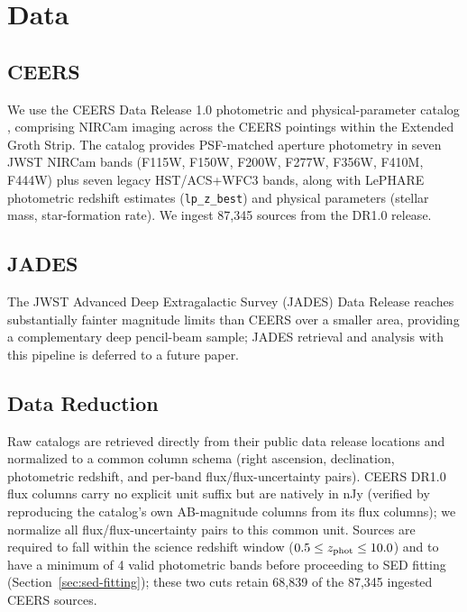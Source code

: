 \documentclass[twocolumn]{aastex631}
\begin{document}
\section{Data}
\label{sec:data}

\subsection{CEERS}
\label{sec:data-ceers}

We use the CEERS Data Release 1.0 photometric and physical-parameter
catalog \citep{Cox2025}, comprising NIRCam \citep{Rieke2023} imaging across
the CEERS \citep{Finkelstein2023} pointings within the Extended Groth
Strip. The catalog provides PSF-matched aperture photometry in seven JWST
NIRCam bands (F115W, F150W, F200W, F277W, F356W, F410M, F444W) plus seven
legacy HST/ACS+WFC3 bands, along with LePHARE photometric redshift
estimates (\texttt{lp\_z\_best}) and physical parameters (stellar mass,
star-formation rate). We ingest 87,345 sources from the DR1.0 release.

\subsection{JADES}
\label{sec:data-jades}

The JWST Advanced Deep Extragalactic Survey (JADES) Data Release
\citep{Eisenstein2023} reaches substantially fainter magnitude limits than
CEERS over a smaller area, providing a complementary deep pencil-beam
sample; JADES retrieval and analysis with this pipeline is deferred to a
future paper.

\subsection{Data Reduction}
\label{sec:data-reduction}

Raw catalogs are retrieved directly from their public data release
locations and normalized to a common column schema (right ascension,
declination, photometric redshift, and per-band flux/flux-uncertainty
pairs). CEERS DR1.0 flux columns carry no explicit unit suffix but are
natively in nJy (verified by reproducing the catalog's own AB-magnitude
columns from its flux columns); we normalize all flux/flux-uncertainty
pairs to this common unit. Sources are required to fall within the science
redshift window ($0.5 \le z_{\rm phot} \le 10.0$) and to have a minimum of
4 valid photometric bands before proceeding to SED fitting
(Section~\ref{sec:sed-fitting}); these two cuts retain 68,839 of the
87,345 ingested CEERS sources.
\end{document}
